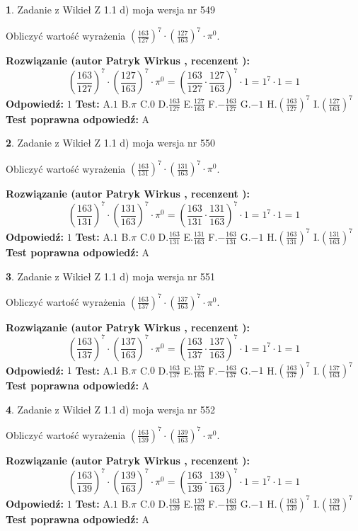 \documentclass[12pt, a4paper]{article}
\theoremstyle{definition} %
\newtheorem{zad}{}
\newcommand{\zadStart}[1]{\begin{zad}#1\newline}
\newcommand{\zadStop}{\end{zad}}
\newcommand{\rozwStart}[2]{\noindent \textbf{Rozwiązanie (autor #1 , recenzent #2): }\newline}
\newcommand{\rozwStop}{\newline}
\newcommand{\odpStart}{\noindent \textbf{Odpowiedź:}\newline}
\newcommand{\odpStop}{\newline}
\newcommand{\testStart}{\noindent \textbf{Test:}\newline}
\newcommand{\testStop}{\newline}
\newcommand{\kluczStart}{\noindent \textbf{Test poprawna odpowiedź:}\newline}
\newcommand{\kluczStop}{\newline}
\begin{document}
\zadStart{Zadanie z Wikieł Z 1.1 d) moja wersja nr 549}

Obliczyć wartość wyrażenia $(\frac{163}{127})^{7} \cdot (\frac{127}{163})^{7} \cdot \pi^{0}$.
\zadStop
\rozwStart{Patryk Wirkus}{}
$$(\frac{163}{127})^{7} \cdot (\frac{127}{163})^{7} \cdot \pi^{0} = (\frac{163}{127} \cdot \frac{127}{163})^{7} \cdot 1 = 1^{7} \cdot 1 = 1$$
\rozwStop
\odpStart
$1$
\odpStop
\testStart
A.$1$ B.$\pi$ C.$0$ D.$\frac{163}{127}$ E.$\frac{127}{163}$
F.$-\frac{163}{127}$ G.$-1$
H.$(\frac{163}{127})^{7}$
I.$(\frac{127}{163})^{7}$
\testStop
\kluczStart
A
\kluczStop



\zadStart{Zadanie z Wikieł Z 1.1 d) moja wersja nr 550}

Obliczyć wartość wyrażenia $(\frac{163}{131})^{7} \cdot (\frac{131}{163})^{7} \cdot \pi^{0}$.
\zadStop
\rozwStart{Patryk Wirkus}{}
$$(\frac{163}{131})^{7} \cdot (\frac{131}{163})^{7} \cdot \pi^{0} = (\frac{163}{131} \cdot \frac{131}{163})^{7} \cdot 1 = 1^{7} \cdot 1 = 1$$
\rozwStop
\odpStart
$1$
\odpStop
\testStart
A.$1$ B.$\pi$ C.$0$ D.$\frac{163}{131}$ E.$\frac{131}{163}$
F.$-\frac{163}{131}$ G.$-1$
H.$(\frac{163}{131})^{7}$
I.$(\frac{131}{163})^{7}$
\testStop
\kluczStart
A
\kluczStop



\zadStart{Zadanie z Wikieł Z 1.1 d) moja wersja nr 551}

Obliczyć wartość wyrażenia $(\frac{163}{137})^{7} \cdot (\frac{137}{163})^{7} \cdot \pi^{0}$.
\zadStop
\rozwStart{Patryk Wirkus}{}
$$(\frac{163}{137})^{7} \cdot (\frac{137}{163})^{7} \cdot \pi^{0} = (\frac{163}{137} \cdot \frac{137}{163})^{7} \cdot 1 = 1^{7} \cdot 1 = 1$$
\rozwStop
\odpStart
$1$
\odpStop
\testStart
A.$1$ B.$\pi$ C.$0$ D.$\frac{163}{137}$ E.$\frac{137}{163}$
F.$-\frac{163}{137}$ G.$-1$
H.$(\frac{163}{137})^{7}$
I.$(\frac{137}{163})^{7}$
\testStop
\kluczStart
A
\kluczStop



\zadStart{Zadanie z Wikieł Z 1.1 d) moja wersja nr 552}

Obliczyć wartość wyrażenia $(\frac{163}{139})^{7} \cdot (\frac{139}{163})^{7} \cdot \pi^{0}$.
\zadStop
\rozwStart{Patryk Wirkus}{}
$$(\frac{163}{139})^{7} \cdot (\frac{139}{163})^{7} \cdot \pi^{0} = (\frac{163}{139} \cdot \frac{139}{163})^{7} \cdot 1 = 1^{7} \cdot 1 = 1$$
\rozwStop
\odpStart
$1$
\odpStop
\testStart
A.$1$ B.$\pi$ C.$0$ D.$\frac{163}{139}$ E.$\frac{139}{163}$
F.$-\frac{163}{139}$ G.$-1$
H.$(\frac{163}{139})^{7}$
I.$(\frac{139}{163})^{7}$
\testStop
\kluczStart
A
\kluczStop
\end{document}
